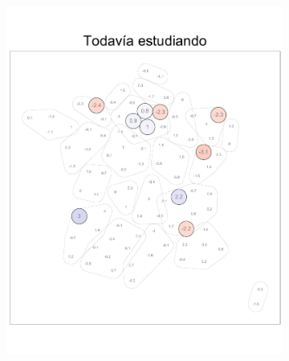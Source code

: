 \begin{figure}
	\centering
	\begin{subfigure}{0.275\textwidth}
	\includegraphics[width = \textwidth]{Figs/Efectos/Dorling_Efectos_Esc_Modelo_H}
	\end{subfigure}
	~
	\begin{subfigure}{0.275\textwidth}

\end{subfigure}
\end{figure}
